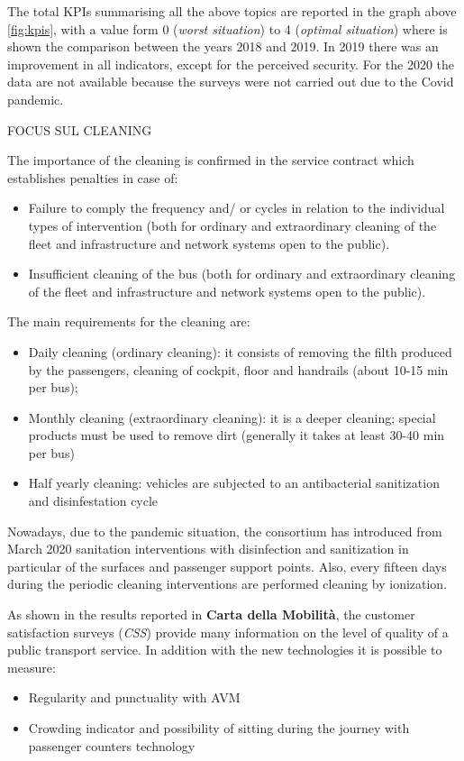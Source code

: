 The total KPIs summarising all the above topics are reported in the graph above \ref{fig:kpis}, with a value form 0 (\textit{worst situation}) to 4 (\textit{optimal situation}) where is shown the comparison between the years 2018 and 2019. In 2019 there was an improvement in all indicators, except for the perceived security. For the 2020 the data are not available because the surveys were not carried out due to the Covid pandemic.

FOCUS SUL CLEANING

The importance of the cleaning is confirmed in the service contract which establishes penalties in case of:
\begin{itemize}
    \item Failure to comply the frequency and/ or cycles in relation to the individual types of intervention (both for ordinary and extraordinary cleaning of the fleet and infrastructure and network systems open to the public).
    \item Insufficient cleaning of the bus (both for ordinary and extraordinary cleaning of the fleet and infrastructure and network systems open to the public).
\end{itemize}

The main requirements for the cleaning are:
\begin{itemize}
    \item Daily cleaning (ordinary cleaning): it consists of removing the filth produced by the passengers, cleaning of cockpit, floor and handrails (about 10-15 min per bus);
    \item Monthly cleaning (extraordinary cleaning): it is a deeper cleaning; special products must be used to remove dirt (generally it takes at least 30-40 min per bus)
    \item Half yearly cleaning: vehicles are subjected to an antibacterial sanitization and disinfestation cycle
\end{itemize}

Nowadays, due to the pandemic situation, the consortium has introduced from March 2020 sanitation interventions with disinfection and sanitization in particular of the surfaces and passenger support points. Also, every fifteen days during the periodic cleaning interventions are performed cleaning by ionization.



As shown in the results reported in \textbf{Carta della Mobilità}, the customer satisfaction surveys (\textit{CSS}) provide many information on the level of quality of a public transport service.
In addition with the new technologies it is possible to measure:
\begin{itemize}
    \item Regularity and punctuality with AVM
    \item Crowding indicator and possibility of sitting during the journey with passenger counters technology
\end{itemize}

